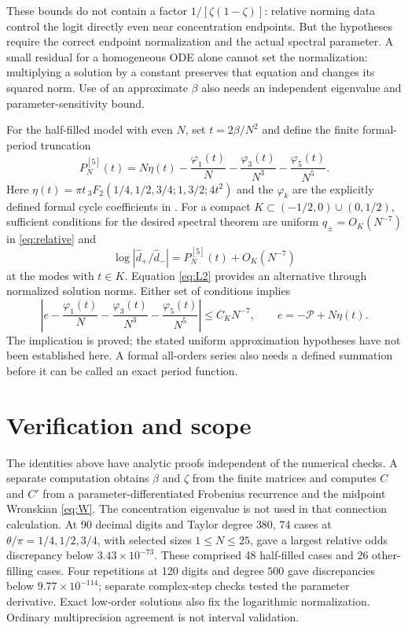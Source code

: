 \documentclass[10pt]{article}
\begin{document}
These bounds do not contain a factor $1/[\zeta(1-\zeta)]$:
relative norming data control the logit directly even near concentration
endpoints. But the hypotheses require the correct endpoint normalization
and the actual spectral parameter. A small residual for a homogeneous
ODE alone cannot set the normalization: multiplying a solution by a
constant preserves that equation and changes its squared norm.
Use of an approximate $\beta$ also needs an independent eigenvalue and
parameter-sensitivity bound.

For the half-filled model with even $N$, set $t=2\beta/N^2$ and define the finite
formal-period truncation
\begin{equation}
P_N^{[5]}(t)=N\eta(t)-\frac{\varphi_1(t)}N
-\frac{\varphi_3(t)}{N^3}-\frac{\varphi_5(t)}{N^5}.
\label{eq:period}
\end{equation}
Here $\eta(t)=\pi t\,{}_3F_2(1/4,1/2,3/4;1,3/2;4t^2)$ and the
$\varphi_k$ are the explicitly defined formal cycle coefficients
in \cite{periods}. For a compact $K\subset(-1/2,0)\cup(0,1/2)$, sufficient
conditions for the desired spectral theorem are uniform
$q_\pm=O_K(N^{-7})$ in \eqref{eq:relative} and
\[
\log|\widehat d_+/\widehat d_-|
=P_N^{[5]}(t)+O_K(N^{-7})
\]
at the modes with $t\in K$. Equation \eqref{eq:L2} provides an alternative
through normalized solution norms. Either set of conditions implies
\begin{equation}
\left|e-\frac{\varphi_1(t)}N-\frac{\varphi_3(t)}{N^3}
-\frac{\varphi_5(t)}{N^5}\right|\le C_KN^{-7},
\qquad e=-\mathcal P+N\eta(t).
\label{eq:target}
\end{equation}
The implication is proved; the stated uniform approximation hypotheses
have not been established here. A formal all-orders series also needs a
defined summation before it can be called an exact period function.

\section{Verification and scope}
The identities above have analytic proofs independent of the numerical
checks. A separate computation obtains $\beta$ and $\zeta$ from the
finite matrices and computes $C$ and $C'$ from a parameter-differentiated
Frobenius recurrence and the midpoint Wronskian \eqref{eq:W}.
The concentration eigenvalue is not used in that connection calculation.
At 90 decimal digits and Taylor degree $380$, 74 cases at
$\theta/\pi=1/4,1/2,3/4$, with selected sizes $1\le N\le25$, gave a
largest relative odds discrepancy below $3.43\times10^{-73}$.
These comprised 48 half-filled cases and 26 other-filling cases.
Four repetitions at 120 digits and degree $500$ gave discrepancies below
$9.77\times10^{-114}$; separate complex-step checks tested the parameter
derivative. Exact low-order solutions also fix the logarithmic normalization.
Ordinary multiprecision agreement is not interval validation.
\end{document}
